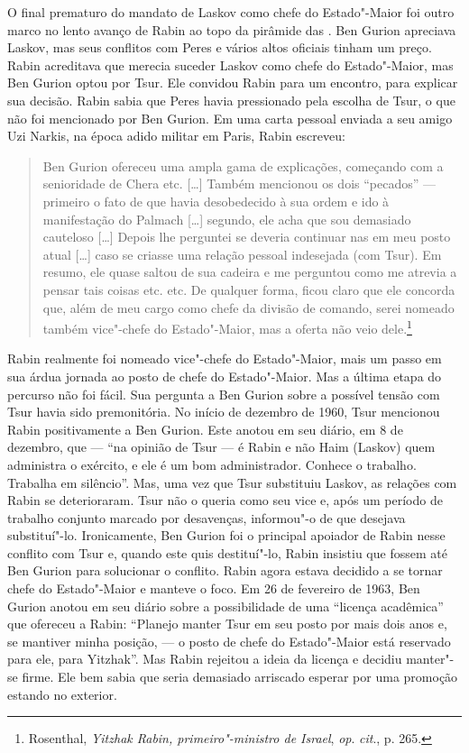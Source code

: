 O final prematuro do mandato de Laskov como chefe do Estado"-Maior foi
outro marco no lento avanço de Rabin ao topo da pirâmide das . Ben
Gurion apreciava Laskov, mas seus conflitos com Peres e vários altos
oficiais tinham um preço. Rabin acreditava que merecia suceder Laskov
como chefe do Estado"-Maior, mas Ben Gurion optou por Tsur. Ele convidou
Rabin para um encontro, para explicar sua decisão. Rabin sabia que Peres
havia pressionado pela escolha de Tsur, o que não foi mencionado por Ben
Gurion. Em uma carta pessoal enviada a seu amigo Uzi Narkis, na época
adido militar em Paris, Rabin escreveu: 

\begin{quote}
Ben Gurion ofereceu uma ampla
gama de explicações, começando com a senioridade de Chera etc. {[}\ldots{}{]}
Também mencionou os dois ``pecados'' --- primeiro o fato de que havia
desobedecido à sua ordem e ido à manifestação do Palmach {[}\ldots{}{]} segundo, ele
acha que sou demasiado cauteloso {[}\ldots{}{]} Depois lhe perguntei se deveria
continuar nas  em meu posto atual {[}\ldots{}{]} caso se criasse uma relação
pessoal indesejada (com Tsur). Em resumo, ele quase saltou de sua
cadeira e me perguntou como me atrevia a pensar tais coisas etc. etc.
De qualquer forma, ficou claro que ele concorda que, além de meu cargo
como chefe da divisão de comando, serei nomeado também vice"-chefe do
Estado"-Maior, mas a oferta não veio dele.\footnote{Rosenthal, \emph{Yitzhak Rabin, primeiro"-ministro de Israel}, \emph{op}. \emph{cit}., p. 265.}
\end{quote}

Rabin realmente foi nomeado vice"-chefe do Estado"-Maior, mais um passo em
sua árdua jornada ao posto de chefe do Estado"-Maior. Mas a última etapa
do percurso não foi fácil. Sua pergunta a Ben Gurion sobre a possível
tensão com Tsur havia sido premonitória. No início de dezembro de 1960,
Tsur mencionou Rabin positivamente a Ben Gurion. Este anotou em
seu diário, em 8 de dezembro, que --- ``na opinião de Tsur --- é Rabin e não
Haim (Laskov) quem administra o exército, e ele é um bom administrador.
Conhece o trabalho. Trabalha em silêncio''. Mas, uma vez que Tsur
substituiu Laskov, as relações com Rabin se deterioraram. Tsur não o
queria como seu vice e, após um período de trabalho conjunto marcado por
desavenças, informou"-o de que desejava substituí"-lo. Ironicamente, Ben
Gurion foi o principal apoiador de Rabin nesse conflito com Tsur e,
quando este quis destituí"-lo, Rabin insistiu que fossem até Ben Gurion
para solucionar o conflito. Rabin agora estava decidido a se tornar
chefe do Estado"-Maior e manteve o foco. Em 26 de fevereiro de 1963, Ben
Gurion anotou em seu diário sobre a possibilidade de uma ``licença
acadêmica'' que ofereceu a Rabin: ``Planejo manter Tsur em
seu posto por mais dois anos e, se mantiver minha posição, --- o posto de
chefe do Estado"-Maior está reservado para ele, para Yitzhak''. Mas Rabin
rejeitou a ideia da licença e decidiu manter"-se firme. Ele bem sabia que
seria demasiado arriscado esperar por uma promoção estando no exterior.

